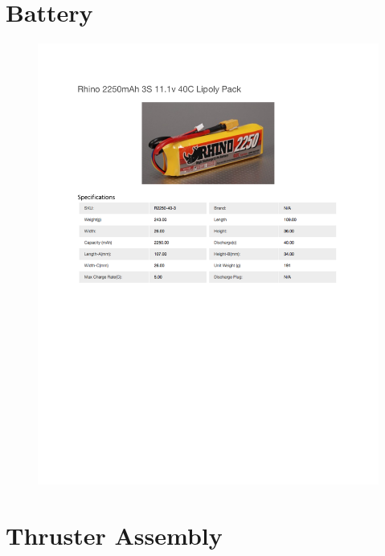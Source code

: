 \documentclass[../main.tex]{subfiles}
\begin{document}
\section{Battery \cite{Battery}} \label{Battery}
\begin{figure}[H]
	\centering
	\includegraphics[width=\textwidth]{img/specs/battery_2250.pdf}
\end{figure}

\section{Thruster Assembly} \label{Thruster}

\end{document}
